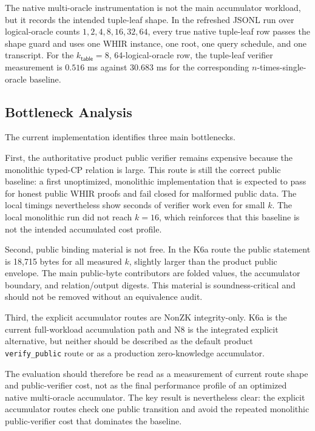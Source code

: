 \documentclass[11pt]{article}
\theoremstyle{definition}
\begin{document}
The native multi-oracle instrumentation is not the main accumulator workload,
but it records the intended tuple-leaf shape. In the refreshed JSONL run over
logical-oracle counts \(1,2,4,8,16,32,64\), every true native tuple-leaf row
passes the shape guard and uses one WHIR instance, one root, one query schedule,
and one transcript. For the \(k_{\mathsf{table}}=8\), 64-logical-oracle row, the
tuple-leaf verifier measurement is \(0.516\) ms against \(30.683\) ms for the
corresponding \(n\)-times-single-oracle baseline.

\subsection{Bottleneck Analysis}
\label{sec:bottleneck-analysis}

The current implementation identifies three main bottlenecks.

First, the authoritative product public verifier remains expensive because the
monolithic typed-CP relation is large. This route is still the correct public
baseline: a first unoptimized, monolithic implementation that is expected to
pass for honest public WHIR proofs and fail closed for malformed public data.
The local timings nevertheless show seconds of verifier work even for small
\(k\). The local monolithic run did not reach \(k=16\), which reinforces that
this baseline is not the intended accumulated cost profile.

Second, public binding material is not free. In the K6a route the public
statement is 18,715 bytes for all measured \(k\), slightly larger than the
product public envelope. The main public-byte contributors are folded values,
the accumulator boundary, and relation/output digests. This material is
soundness-critical and should not be removed without an equivalence audit.

Third, the explicit accumulator routes are NonZK integrity-only. K6a is the
current full-workload accumulation path and N8 is the integrated explicit
alternative, but neither should be described as the default product
\texttt{verify\_public} route or as a production zero-knowledge accumulator.

The evaluation should therefore be read as a measurement of current route shape
and public-verifier cost, not as the final performance profile of an optimized
native multi-oracle accumulator. The key result is nevertheless clear: the
explicit accumulator routes check one public transition and avoid the repeated
monolithic public-verifier cost that dominates the baseline.
\end{document}
